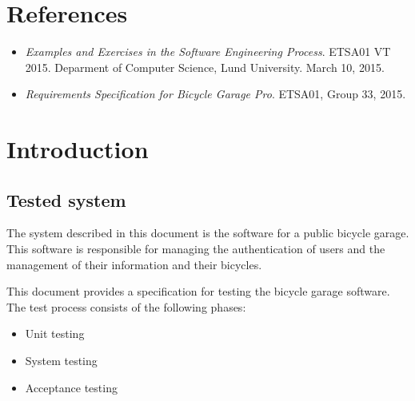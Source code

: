 \documentclass[12pt,titlepage]{article}
\begin{document}


\maketitle
\newpage
\tableofcontents
\thispagestyle{empty}
\setcounter{page}{0}
\newpage


\section{References}
\label{sec:references}

\begin{itemize}
	\item \textit{Examples and Exercises in the Software
		Engineering Process}. ETSA01 VT 2015. Deparment of Computer
		Science, Lund University. March 10, 2015.
	\item \textit{Requirements Specification for Bicycle Garage Pro}. ETSA01, Group 33, 2015.
\end{itemize}


\section{Introduction}
\label{sec:introduction}

\subsection{Tested system}
\label{subsec:tested-system}

The system described in this document is the software for a public bicycle
garage. This software is responsible for managing the authentication of users
and the management of their information and their bicycles.

This document provides a specification for testing the bicycle garage software.
The test process consists of the following phases:

\begin{itemize}
	\item Unit testing
	\item System testing
	\item Acceptance testing
\end{itemize}
\end{document}
